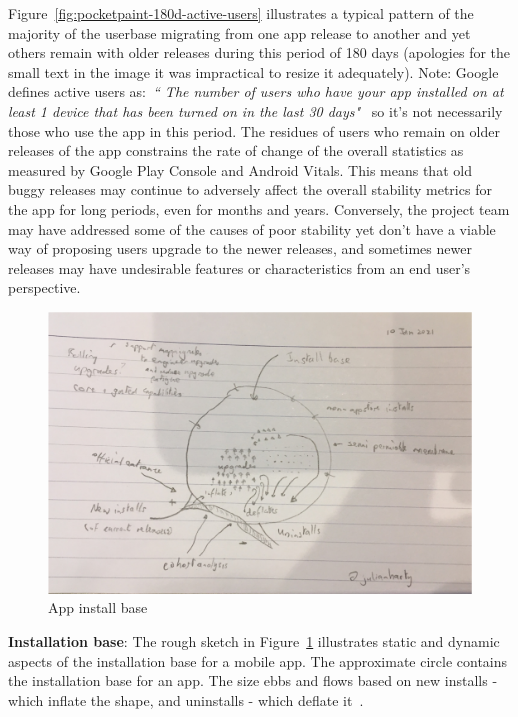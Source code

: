 Figure~\ref{fig:pocketpaint-180d-active-users} illustrates a typical pattern of the majority of the userbase migrating from one app release to another and yet others remain with older releases during this period of 180 days (apologies for the small text in the image it was impractical to resize it adequately). Note: Google defines active users as:~\emph{``
The number of users who have your app installed on at least 1 device that has been turned on in the last 30 days"}~ so it's not necessarily those who use the app in this period. The residues of users who remain on older releases of the app constrains the rate of change of the overall statistics as measured by Google Play Console and Android Vitals. This means that old buggy releases may continue to adversely affect the overall stability metrics for the app for long periods, even for months and years. Conversely, the project team may have addressed some of the causes of poor stability yet don't have a viable way of proposing users upgrade to the newer releases, and sometimes newer releases may have undesirable features or characteristics from an end user's perspective.

\begin{figure}
    \includegraphics[width=\linewidth]{images/rough-sketches/app-install-base.pdf}
    \caption{App install base}
    \label{fig:app-install-base-rough}
\end{figure}

\textbf{Installation base}: The rough sketch in Figure~\ref{fig:app-install-base-rough} illustrates static and dynamic aspects of the installation base for a mobile app. The approximate circle contains the installation base for an app. The size ebbs and flows based on new installs - which inflate the shape, and uninstalls - which deflate it~. 


